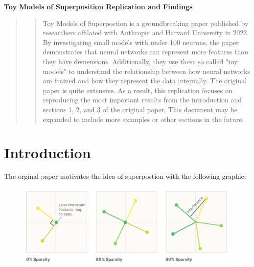 \documentclass{article} %
\begin{document}


\noindent\makebox[\linewidth]{\rule{\textwidth}{1pt}} 
\vspace*{0mm} %
\begin{center}
    \Large\textbf{Toy Models of Superposition Replication and Findings}
\end{center}
\vspace*{2mm} %
\noindent\makebox[\linewidth]{\rule{\textwidth}{1pt}}
\vspace*{0mm}

\begin{abstract}
\begin{quote}
    Toy Models of Superpostion\cite{elhage2022toy} is a groundbreaking paper published by 
    researchers affilated with Anthropic and Harvard University in 2022. By 
    investigating small models with under 100 neurons, the paper demonstrates 
    that neural networks can represent more features than they have demensions. 
    Additionally, they use these so called "toy models" to understand the 
    relationship between how neural networks are trained and how they represent 
    the data internally. The original paper is quite extensive. As a result, this
    replication focuses on reproducing the most important results from the  
    introduction and sections 1, 2, and 3 of the original paper. This document 
    may be expanded to include more examples or other sections in the future.
\end{quote}
\end{abstract}
\section{Introduction}
The orginal paper motivates the idea of superpostion with the following graphic:

\begin{figure}[h]
    \centering
    \includegraphics[width=0.61\linewidth]{section_1/images/section1_anthropic_graphic_.png}
    \captionsetup{font=footnotesize} %
    \label{fig:section1_anthropic}
\end{figure}
\end{document}
